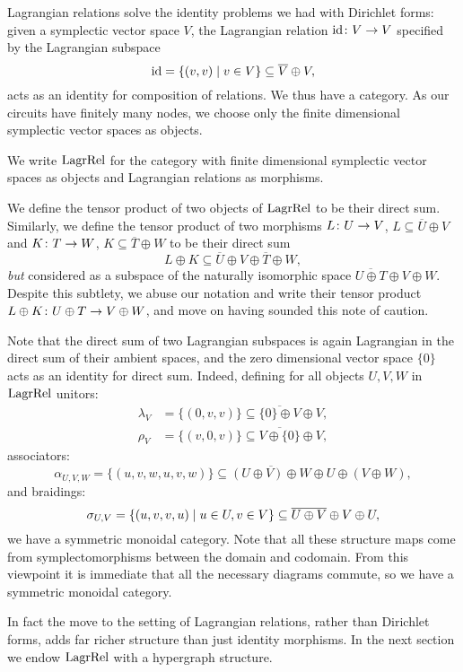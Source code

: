 Lagrangian relations solve the identity problems we had with Dirichlet forms:
given a symplectic vector space $V$, the Lagrangian relation $\mathrm{id}{\colon} V \to V$
specified by the Lagrangian subspace
\[
  \mathrm{id} = \{(v,v) \mid v \in V\} \subseteq \overline{V} \oplus V,
\]
acts as an identity for composition of relations. We thus have a category. As
our circuits have finitely many nodes, we choose only the finite dimensional
symplectic vector spaces as objects.

\begin{definition}
  We write $\mathrm{LagrRel}$ for the category with finite dimensional
  symplectic vector spaces as objects and Lagrangian relations as morphisms. 
\end{definition}

We define the tensor product of two objects of $\mathrm{LagrRel}$ to be their
direct sum. Similarly, we define the tensor product of two morphisms $L{\colon} U
\to V$, $L \subseteq \overline{U}\oplus V$ and $K{\colon} T \to W$, $K \subseteq
\overline{T} \oplus W$ to be their direct sum
\[
  L \oplus K \subseteq \overline{U}\oplus V \oplus\overline{T} \oplus W,
\]
\emph{but} considered as a subspace of the naturally isomorphic space
$\overline{U \oplus T} \oplus V \oplus W$.  Despite this subtlety, we abuse our
notation and write their tensor product $L \oplus K{\colon} U \oplus T \to V \oplus
W$, and move on having sounded this note of caution. 

Note that the direct sum of two Lagrangian subspaces is
again Lagrangian in the direct sum of their ambient spaces, and the zero
dimensional vector space $\{0\}$ acts as an identity for direct sum. Indeed,
defining for all objects $U,V,W$ in $\mathrm{LagrRel}$ unitors: 
\begin{align*}
  \lambda_V &= \{(0,v,v)\} \subseteq \overline{\{0\} \oplus V} \oplus V, \\
  \rho_V &= \{(v,0,v)\} \subseteq \overline{V \oplus \{0\}} \oplus V,
\end{align*}
associators:
\[
  \alpha_{U,V,W}= \{(u,v,w,u,v,w)\} \subseteq \overline{(U \oplus V)\oplus W}
  \oplus U \oplus (V \oplus W),
\]
and braidings:
\[
  \sigma_{U,V} = \{(u,v,v,u) \mid u \in U, v \in V\} \subseteq \overline{U \oplus V}
  \oplus V \oplus U,
\]
we have a symmetric monoidal category.  Note that all these structure
maps come from symplectomorphisms between the domain and codomain. From this
viewpoint it is immediate that all the necessary diagrams commute, so we
have a symmetric monoidal category. 

In fact the move to the setting of Lagrangian relations, rather than Dirichlet
forms, adds far richer structure than just identity morphisms. In the next
section we endow $\mathrm{LagrRel}$ with a hypergraph structure.

